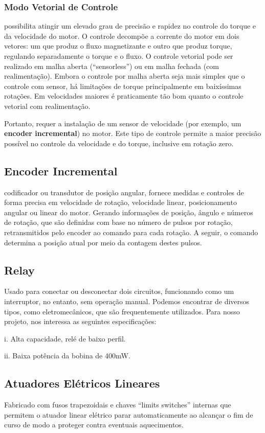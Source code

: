 \documentclass[a4paper, 12pt]{article}
\begin{document}
\subsubsection{Modo Vetorial de Controle}
possibilita atingir um elevado grau de precisão e rapidez no controle do torque e da velocidade do motor. O controle decompõe a corrente do motor em dois vetores: um que produz o fluxo magnetizante e outro que produz torque, regulando separadamente o torque e o fluxo. O controle vetorial pode ser realizado em malha aberta (“sensorless”) ou em malha fechada (com realimentação). Embora o controle por malha aberta seja mais simples que o controle com sensor, há limitações de torque principalmente em baixíssimas rotações. Em velocidades maiores é praticamente tão bom quanto o controle vetorial com realimentação. 

Portanto, requer a instalação de um sensor de velocidade (por exemplo, um \textbf{encoder incremental}) no motor. Este tipo de controle permite a maior precisão possível no controle da velocidade e do torque, inclusive em rotação zero.

\subsection{Encoder Incremental}
codificador ou transdutor de posição angular, fornece medidas e controles de forma precisa em velocidade de rotação, velocidade linear, posicionamento angular ou linear do motor.
Gerando informações de posição, ângulo e números de rotação, que são definidas com base no número de pulsos por rotação, retransmitidos pelo encoder ao comando para cada rotação. A seguir, o comando determina a posição atual por meio da contagem destes pulsos.

\subsection{Relay}
Usado para conectar ou desconectar dois circuitos, funcionando como um interruptor, no entanto, sem operação manual. Podemos encontrar de diversos tipos, como eletromecânicos, que são frequentemente utilizados. Para nosso projeto, nos interessa as seguintes especificações:

i. Alta capacidade, relé de baixo perfil.

ii. Baixa potência da bobina de 400mW.

\subsection{Atuadores Elétricos Lineares}
Fabricado com fusos trapezoidais  e chaves “limits switches” internas que permitem o atuador linear elétrico parar automaticamente ao alcançar o fim de curso de modo a proteger contra eventuais aquecimentos.
\end{document}

